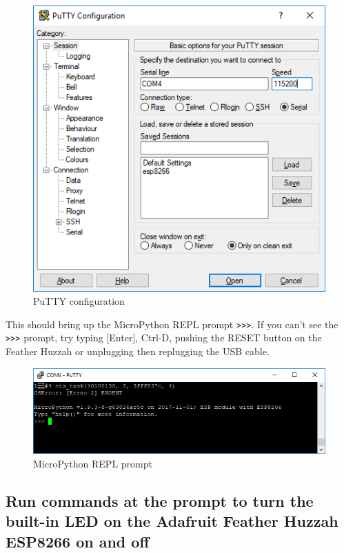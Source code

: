 \documentclass{book}
\makeatletter
\def\maxwidth{\ifdim\Gin@nat@width>\linewidth\linewidth
    \else\Gin@nat@width\fi}
\let\Oldincludegraphics\includegraphics
\renewcommand{\includegraphics}[1]{\Oldincludegraphics[width=.8\maxwidth]{#1}}
\makeatother
\begin{document}
\begin{figure}
\centering
\includegraphics{images/putty_config.PNG}
\caption{PuTTY configuration}
\end{figure}

This should bring up the MicroPython REPL prompt \lstinline!>>>!. If you
can't see the \lstinline!>>>! prompt, try typing {[}Enter{]}, Ctrl-D,
pushing the RESET button on the Feather Huzzah or unplugging then
replugging the USB cable.

\begin{figure}
\centering
\includegraphics{images/REPL_prompt.PNG}
\caption{MicroPython REPL prompt}
\end{figure}
    




    
        \subsection{Run commands at the prompt to turn the built-in LED on the
Adafruit Feather Huzzah ESP8266 on and
off}\label{run-commands-at-the-prompt-to-turn-the-built-in-led-on-the-adafruit-feather-huzzah-esp8266-on-and-off}
    
\end{document}
